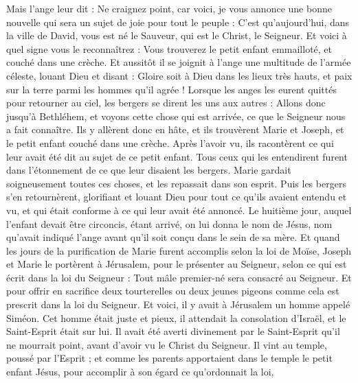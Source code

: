 \begin{multicols}{2}
Mais l’ange leur dit : Ne craignez point, car voici, je vous annonce une bonne nouvelle qui sera un sujet de joie pour tout le peuple :
C’est qu'aujourd'hui, dans la ville de David, vous est né le Sauveur, qui est le Christ, le Seigneur.
Et voici à quel signe vous le reconnaîtrez : Vous trouverez le petit enfant emmailloté, et couché dans une crèche.
Et aussitôt il se joignit à l'ange une multitude de l'armée céleste, louant Dieu et disant :
Gloire soit à Dieu dans les lieux très hauts, et paix sur la terre parmi les hommes qu’il agrée !
Lorsque les anges les eurent quittés pour retourner au ciel, les bergers se dirent les uns aux autres : Allons donc jusqu'à Bethléhem, et voyons cette chose qui est arrivée, ce que le Seigneur nous a fait connaître.
Ils y allèrent donc en hâte, et ils trouvèrent Marie et Joseph, et le petit enfant couché dans une crèche.
Après l’avoir vu, ils racontèrent ce qui leur avait été dit au sujet de ce petit enfant.
Tous ceux qui les entendirent furent dans l’étonnement de ce que leur disaient les bergers.
Marie gardait soigneusement toutes ces choses, et les repassait dans son esprit.
Puis les bergers s'en retournèrent, glorifiant et louant Dieu pour tout ce qu’ils avaient entendu et vu, et qui était conforme à ce qui leur avait été annoncé.
Le huitième jour, auquel l'enfant devait être circoncis, étant arrivé, on lui donna le nom de Jésus, nom qu’avait indiqué l'ange avant qu'il soit conçu dans le sein de sa mère.
Et quand les jours de la purification de Marie furent accomplis selon la loi de Moïse, Joseph et Marie le portèrent à Jérusalem, pour le présenter au Seigneur,
selon ce qui est écrit dans la loi du Seigneur : Tout mâle premier-né sera consacré au Seigneur.
Et pour offrir en sacrifice deux tourterelles ou deux jeunes pigeons comme cela est prescrit dans la loi du Seigneur.
Et voici, il y avait à Jérusalem un homme appelé Siméon. Cet homme était juste et pieux, il attendait la consolation d'Israël, et le Saint-Esprit était sur lui.
Il avait été averti divinement par le Saint-Esprit qu'il ne mourrait point, avant d’avoir vu le Christ du Seigneur.
Il vint au temple, poussé par l'Esprit ; et comme les parents apportaient dans le temple le petit enfant Jésus, pour accomplir à son égard ce qu’ordonnait la loi,

\end{multicols}

